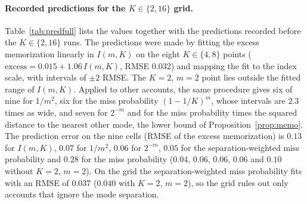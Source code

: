\paragraph{Recorded predictions for the $K \in \{2,16\}$ grid.} Table~\ref{tab:predfull} lists the values together with the predictions recorded before the $K \in \{2, 16\}$ runs. The predictions were made by fitting the excess memorization linearly in $I(m,K)$ on the eight $K \in \{4, 8\}$ points ($\text{excess} = 0.015 + 1.06\,I(m,K)$, RMSE $0.032$) and mapping the fit to the index scale, with intervals of $\pm 2$ RMSE. The $K{=}2$, $m{=}2$ point lies outside the fitted range of $I(m,K)$. Applied to other accounts, the same procedure gives six of nine for $1/m^2$, six for the miss probability $(1-1/K)^m$, whose intervals are $2.3$ times as wide, and seven for $2^{-m}$ and for the miss probability times the squared distance to the nearest other mode, the lower bound of Proposition~\ref{prop:memo}. The prediction error on the nine cells (RMSE of the excess memorization) is $0.13$ for $I(m,K)$, $0.07$ for $1/m^2$, $0.06$ for $2^{-m}$, $0.05$ for the separation-weighted miss probability and $0.28$ for the miss probability ($0.04$, $0.06$, $0.06$, $0.06$ and $0.10$ without $K{=}2$, $m{=}2$). On the grid the separation-weighted miss probability fits with an RMSE of $0.037$ ($0.040$ with $K{=}2$, $m{=}2$), so the grid rules out only accounts that ignore the mode separation.

\begin{table}[h]
\caption{Recorded predictions for the memorization index at 8k steps and the observed two-seed means. The two failed predictions are marked.}
\label{tab:predfull}
\begin{center}
\small
{}
\end{center}
\end{table}

